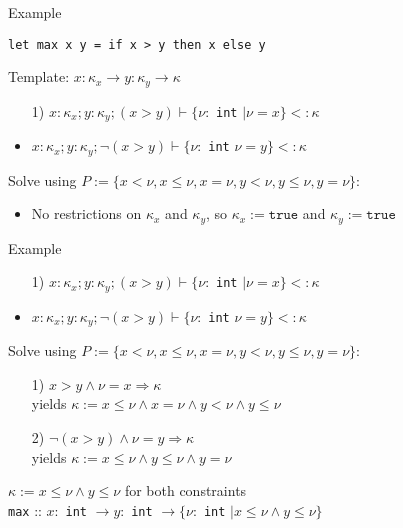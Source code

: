 \documentclass[pdf]{beamer}
\begin{document}
\begin{frame}[fragile]{Example}
  \begin{verbatim}
let max x y = if x > y then x else y
  \end{verbatim}
  Template: $x: \kappa_x \rightarrow y: \kappa_y \rightarrow \kappa$
  \begin{itemize}
    \item[1)] $x: \kappa_x; y: \kappa_y; (x > y) \vdash \{\nu:$ \lstinline{int} $\mid \nu = x \} <: \kappa$
    \item[2)] $x: \kappa_x; y: \kappa_y; \neg(x > y) \vdash \{\nu:$ \lstinline{int} $\nu = y \} <: \kappa$
  \end{itemize}
  Solve using $P := \{x < \nu, x \le \nu, x = \nu, y < \nu, y \le \nu, y = \nu\}$:
  \begin{itemize}
    \item No restrictions on $\kappa_x$ and $\kappa_y$, so $\kappa_x := \mathtt{true}$ and $\kappa_y := \mathtt{true}$
  \end{itemize}
\end{frame}

\begin{frame}{Example}
  \begin{itemize}
    \item[1)] $x: \kappa_x; y: \kappa_y; (x > y) \vdash \{\nu:$ \lstinline{int} $\mid \nu = x \} <: \kappa$
    \item[2)] $x: \kappa_x; y: \kappa_y; \neg(x > y) \vdash \{\nu:$ \lstinline{int} $\nu = y \} <: \kappa$
  \end{itemize}
  Solve using $P := \{x < \nu, x \le \nu, x = \nu, y < \nu, y \le \nu, y = \nu\}$:
  \begin{itemize}
    \item[1)] $x > y \land \nu = x \Rightarrow \kappa$\\
      yields $\kappa := x \le \nu \land x = \nu \land y < \nu \land y \le \nu$
    \item[2)] $\neg(x > y) \land \nu = y \Rightarrow \kappa$\\
      yields $\kappa := x \le \nu \land y \le \nu \land y = \nu$
  \end{itemize}
  $\kappa := x \le \nu \land y \le \nu$ for both constraints\\
  \lstinline{max} :: $x:$ \lstinline{int} $\rightarrow y:$ \lstinline{int} $\rightarrow \{\nu:$ \lstinline{int} $\mid x \le \nu \land y \le \nu\}$
\end{frame}
\end{document}
